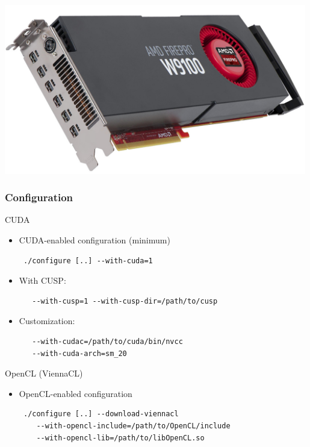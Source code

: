 \begin{frame}[fragile]
\begin{minipage}{0.23\textwidth}
 \includegraphics[width=0.99\textwidth]{figures/w9100.jpg} \\[1.5em]
 \end{minipage}


\end{frame}


\begin{frame}[fragile]
\frametitle{Configuration}
  \begin{block}{CUDA}
    \begin{itemize}
     \item CUDA-enabled configuration (minimum)
     \begin{lstlisting}
 ./configure [..] --with-cuda=1
     \end{lstlisting}
     \item With CUSP:
     \begin{lstlisting}
   --with-cusp=1 --with-cusp-dir=/path/to/cusp
     \end{lstlisting}
     \item Customization:
     \begin{lstlisting}
   --with-cudac=/path/to/cuda/bin/nvcc
   --with-cuda-arch=sm_20
     \end{lstlisting}
    \end{itemize}
  \end{block}
  
  \begin{block}{OpenCL (ViennaCL)}
    \begin{itemize}
     \item OpenCL-enabled configuration
     \begin{lstlisting}
 ./configure [..] --download-viennacl
    --with-opencl-include=/path/to/OpenCL/include
    --with-opencl-lib=/path/to/libOpenCL.so
     \end{lstlisting}
    \end{itemize}
  \end{block}
\end{frame}


